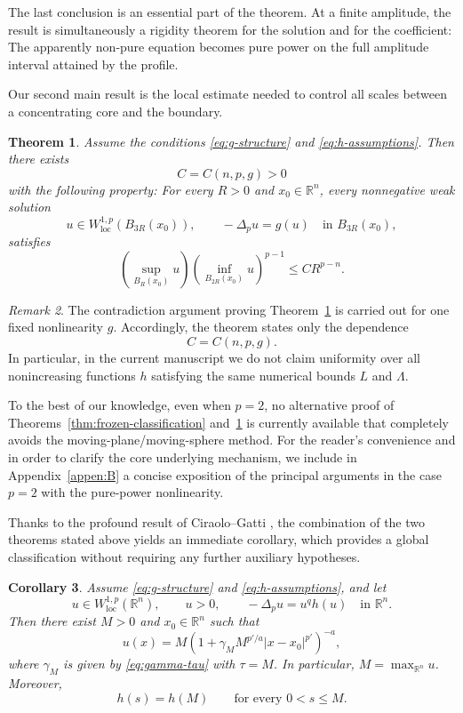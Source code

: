 \documentclass[reqno,12pt]{amsart}
\numberwithin{equation}{section}
\newtheorem{thm}{Theorem}[section]
\newtheorem{cor}[thm]{Corollary}
\theoremstyle{remark}
\newtheorem{rem}[thm]{Remark}
\newcommand{\R}{\mathbb R}
\newcommand{\loc}{\mathrm{loc}}
\begin{document}
The last conclusion is an essential part of the theorem.  At a finite  amplitude, the result is simultaneously a rigidity theorem for the solution and for the coefficient: The apparently non-pure equation becomes pure power on the full amplitude interval attained by the profile.

Our second main result is the local estimate needed to control all scales between a concentrating core and the boundary.

\begin{thm}
\label{thm:main}
Assume the conditions \eqref{eq:g-structure} and \eqref{eq:h-assumptions}.  Then there exists 
$$C=C(n,p,g)>0$$
with the following property:  For every $R>0$ and
$x_0\in\R^n$, every nonnegative weak solution
$$
 u\in W^{1,p}_{\loc}(B_{3R}(x_0)),
 \qquad -\Delta_pu=g(u)\quad\text{in }B_{3R}(x_0),
$$
satisfies
\begin{equation}\label{eq:main-harnack}
 \left(\sup_{B_R(x_0)}u\right)
 \left(\inf_{B_{2R}(x_0)}u\right)^{p-1}
 \le C R^{p-n}.
\end{equation}
\end{thm}

\begin{rem} 
\label{rem:constant-dependence}
The contradiction argument proving Theorem~\ref{thm:main} is carried out for one fixed nonlinearity $g$.  Accordingly, the theorem states only the dependence 
$$C=C(n,p,g).$$
In particular, in the current manuscript we do not claim uniformity over all nonincreasing functions $h$ satisfying the same numerical bounds $L$ and $\Lambda$.
\end{rem}

To the best of our knowledge, even when $p=2$, no alternative proof of Theorems~\ref{thm:frozen-classification} and~\ref{thm:main} is currently available that completely avoids the moving-plane/moving-sphere method. 
For the reader’s convenience and in order to clarify the core underlying mechanism, we include in Appendix~\ref{appen:B} a concise exposition of the principal arguments in the case $p = 2$ with the pure-power nonlinearity.


Thanks to the profound result of Ciraolo--Gatti \cite[Theorem~1.2]{CG2026}, the combination of the two theorems stated above yields an immediate corollary, which provides a global classification without requiring any further auxiliary hypotheses.

\begin{cor} 
\label{cor:full-liouville}
Assume \eqref{eq:g-structure} and \eqref{eq:h-assumptions}, and let
$$
 u\in W^{1,p}_{\loc}(\R^n),
 \qquad u>0,  \qquad -\Delta_pu=u^qh(u)\quad\text{in }\R^n.
$$
Then there exist $M>0$ and $x_0\in\R^n$ such that
\begin{equation}\label{eq:full-liouville-profile}
 u(x)=M\left( 1+\gamma_M M^{p'/a}|x-x_0|^{p'}
 \right)^{-a},
\end{equation}
where $\gamma_M$ is given by \eqref{eq:gamma-tau} with $\tau=M$.
In particular, $M=\max_{\R^n}u$.  Moreover,
$$
 h(s)=h(M) \qquad\text{for every }0<s\le M.
$$
\end{cor}
\end{document}
